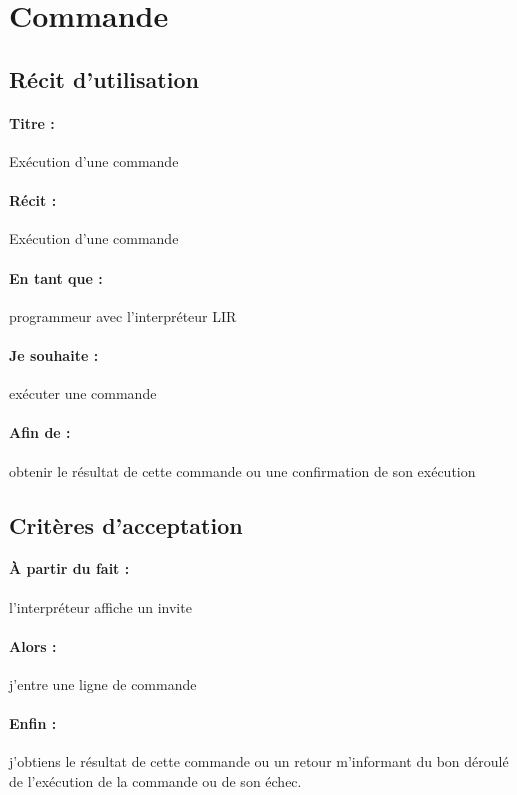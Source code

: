     \section{Commande}

    \subsection*{Récit d'utilisation}

    \paragraph{Titre : } Exécution d'une commande
        \paragraph{Récit : } Exécution d'une commande
    \paragraph{En tant que : } programmeur avec l'interpréteur LIR
    \paragraph{Je souhaite : } exécuter une commande
    \paragraph{Afin de : } obtenir le résultat de cette commande ou une
                               confirmation de son exécution
    \subsection*{Critères d'acceptation}

    \paragraph{À partir du fait : } l'interpréteur affiche un invite
    \paragraph{Alors : } j'entre une ligne de commande
    \paragraph{Enfin : } j'obtiens le résultat de cette commande ou un retour
    m'informant du bon déroulé de l'exécution de la commande ou de son échec.